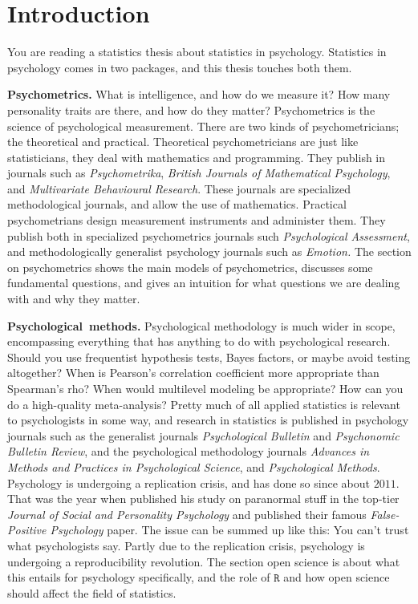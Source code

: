 \section{Introduction}

You are reading a statistics thesis about statistics in psychology. Statistics in psychology comes in two packages, and this thesis touches both them.

\textbf{Psychometrics.} What is intelligence, and how do we measure it? How many personality traits are there, and how do they matter? Psychometrics is the science of psychological measurement. There are two kinds of psychometricians; the theoretical and practical. Theoretical psychometricians are just like statisticians, they deal with mathematics and programming. They publish in journals such as \textit{Psychometrika}, \textit{British Journals of Mathematical Psychology}, and \textit{Multivariate Behavioural Research}. These journals are specialized methodological journals, and allow the use of mathematics. Practical psychometrians design measurement instruments and administer them. They publish both in specialized psychometrics journals such \textit{Psychological Assessment}, and methodologically generalist psychology journals such as \textit{Emotion.} The section on psychometrics shows the main models of psychometrics, discusses some fundamental questions, and gives an intuition for what questions we are dealing with and why they matter.

\textbf{Psychological~methods.} Psychological methodology is much wider in scope, encompassing everything that has anything to do with psychological research. Should you use frequentist hypothesis tests, Bayes factors, or maybe avoid testing altogether? When is Pearson's correlation coefficient more appropriate than Spearman's rho? When would multilevel modeling be appropriate? How can you do a high-quality meta-analysis? Pretty much of all applied statistics is relevant to psychologists in some way, and research in statistics is published in psychology journals such as the generalist journals \textit{Psychological Bulletin} and \textit{Psychonomic Bulletin Review}, and the psychological methodology journals \textit{Advances in Methods and Practices in Psychological Science}, and \textit{Psychological Methods}. Psychology is undergoing a replication crisis, and has done so since about $2011$. That was the year when \cite{Bem2011-vq} published his study on paranormal stuff in the top-tier \textit{Journal of Social and Personality Psychology} and \cite{simmons_false-positive_2011} published their famous \textit{False-Positive Psychology} paper. The issue can be summed up like this: You can't trust what psychologists say. Partly due to the replication crisis, psychology is undergoing a reproducibility revolution. The section open science is about what this entails for psychology specifically, and the role of $\mathtt{R}$
and how open science should affect the field of statistics. 

